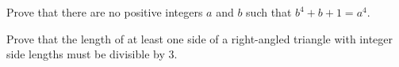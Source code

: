 \begin{challenge}
  Prove that there are no positive integers $a$ and $b$ such that $b^4+b+1 = a^4$.
\end{challenge}







\begin{challenge}
  Prove that the length of at least one side of a right-angled triangle with integer side lengths must be divisible by 3.
\end{challenge}

